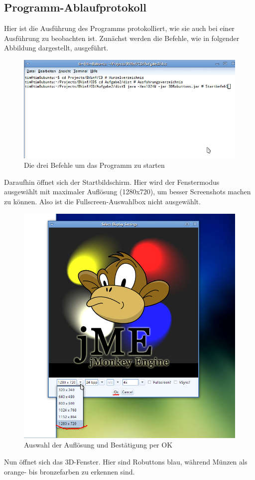\subsection{Programm-Ablaufprotokoll}
Hier ist die Ausführung des Programms protokolliert, wie sie auch bei einer Ausführung zu beobachten ist.
Zunächst werden die Befehle, wie in folgender Abbildung dargestellt, ausgeführt.
\begin{figure}[h]
 \includegraphics[width=\textwidth,height=.48\textwidth]{3d/1Konsole.png}
 \caption{Die drei Befehle um das Programm zu starten}
\end{figure}
\newline
Daraufhin öffnet sich der Startbildschirm.
Hier wird der Fenstermodus ausgewählt mit maximaler Auflösung (1280x720), um besser Screenshots machen zu können.
Also ist die Fullscreen-Auswahlbox nicht ausgewählt.
\begin{figure}[h]
 \centering
 \includegraphics[width=.6\textwidth,height=.58\textwidth]{3d/2Aufloesung.png}
 \caption{Auswahl der Auflösung und Bestätigung per OK}
\end{figure}
\clearpage
\newpage
Nun öffnet sich das 3D-Fenster. Hier sind Robuttons blau, während Münzen als orange- bis bronzefarben zu erkennen sind.
